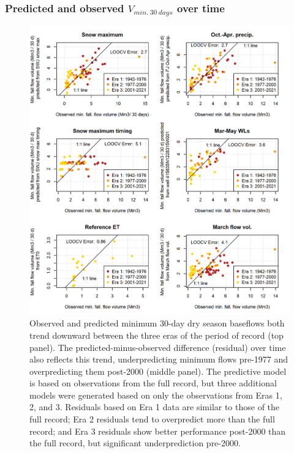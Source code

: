 \documentclass[hess, manuscript]{copernicus}
\begin{document}
\subsubsection{\texorpdfstring{Predicted and observed
\(V_{min.~30~days}\) over
time}{Predicted and observed V\_\{min.\textasciitilde30\textasciitilde days\} over time}}

\begin{figure}
\includegraphics[width=1\linewidth]{f11} \caption{\label{fig:v_min_over_time} Observed and predicted minimum 30-day dry season baseflows both trend downward between the three eras of the period of record (top panel). The predicted-minus-observed difference (residual) over time also reflects this trend, underpredicting minimum flows pre-1977 and overpredicting them post-2000 (middle panel). The predictive model is based on observations from the full record, but three additional models were generated based on only the observations from Eras 1, 2, and 3. Residuals based on Era 1 data are similar to those of the full record; Era 2 residuals tend to overpredict more than the full record; and Era 3 residuals show better performance post-2000 than the full record, but significant underprediction pre-2000.}\label{fig:v_min_over_time}
\end{figure}
\end{document}
